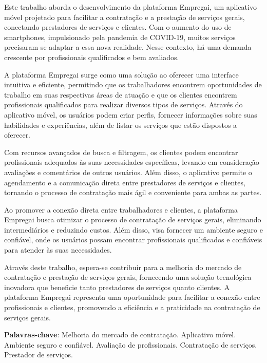 \setlength{\absparsep}{18pt} %
\begin{resumo}
	\SingleSpacing
Este trabalho aborda o desenvolvimento da plataforma Empregai, um aplicativo móvel projetado para facilitar a contratação e a prestação de serviços gerais, conectando prestadores de serviços e clientes. Com o aumento do uso de smartphones, impulsionado pela pandemia de COVID-19, muitos serviços precisaram se adaptar a essa nova realidade. Nesse contexto, há uma demanda crescente por profissionais qualificados e bem avaliados.

A plataforma Empregai surge como uma solução ao oferecer uma interface intuitiva e eficiente, permitindo que os trabalhadores encontrem oportunidades de trabalho em suas respectivas áreas de atuação e que os clientes encontrem profissionais qualificados para realizar diversos tipos de serviços. Através do aplicativo móvel, os usuários podem criar perfis, fornecer informações sobre suas habilidades e experiências, além de listar os serviços que estão dispostos a oferecer.

Com recursos avançados de busca e filtragem, os clientes podem encontrar profissionais adequados às suas necessidades específicas, levando em consideração avaliações e comentários de outros usuários. Além disso, o aplicativo permite o agendamento e a comunicação direta entre prestadores de serviços e clientes, tornando o processo de contratação mais ágil e conveniente para ambas as partes.

Ao promover a conexão direta entre trabalhadores e clientes, a plataforma Empregai busca otimizar o processo de contratação de serviços gerais, eliminando intermediários e reduzindo custos. Além disso, visa fornecer um ambiente seguro e confiável, onde os usuários possam encontrar profissionais qualificados e confiáveis para atender às suas necessidades.

Através deste trabalho, espera-se contribuir para a melhoria do mercado de contratação e prestação de serviços gerais, fornecendo uma solução tecnológica inovadora que beneficie tanto prestadores de serviços quanto clientes. A plataforma Empregai representa uma oportunidade para facilitar a conexão entre profissionais e clientes, promovendo a eficiência e a praticidade na contratação de serviços gerais.

	\textbf{Palavras-chave}: Melhoria do mercado de contratação. Aplicativo móvel. Ambiente seguro e confiável. Avaliação de profissionais. Contratação de serviços. Prestador de serviços.
\end{resumo}

